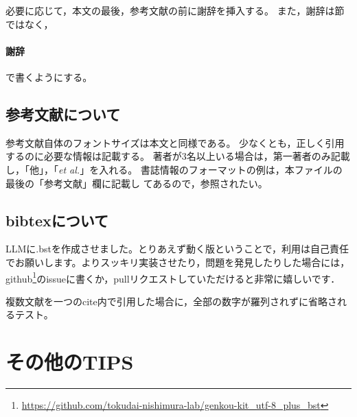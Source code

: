 \documentclass[10pt,twocolumn]{jarticle} %
\begin{document}
必要に応じて，本文の最後，参考文献の前に謝辞を挿入する。
また，謝辞は節ではなく，
\begin{verb}
\paragraph{謝辞}
\end{verb}
で書くようにする。

\subsection{参考文献について}

参考文献自体のフォントサイズは本文と同様である。
少なくとも，正しく引用するのに必要な情報は記載する。
著者が3名以上いる場合は，第一著者のみ記載し，「他」，「{\itshape et
al.}」を入れる。
書誌情報のフォーマットの例は，本ファイルの最後の「参考文献」欄に記載し
てあるので，参照されたい。

\subsection{bibtexについて}

LLMに.bstを作成させました。とりあえず動く版ということで，利用は自己責任でお願いします。よりスッキリ実装させたり，問題を発見したりした場合には，github\footnote{\url{https://github.com/tokudai-nishimura-lab/genkou-kit\_utf-8\_plus\_bst}}のissueに書くか，pullリクエストしていただけると非常に嬉しいです．

複数文献を一つのcite内で引用した場合に，全部の数字が羅列されずに省略されるテスト\cite{obashi19ASJ,Dia_system,setoAPSIPA2018}。

\section{その他のTIPS}
\end{document}
